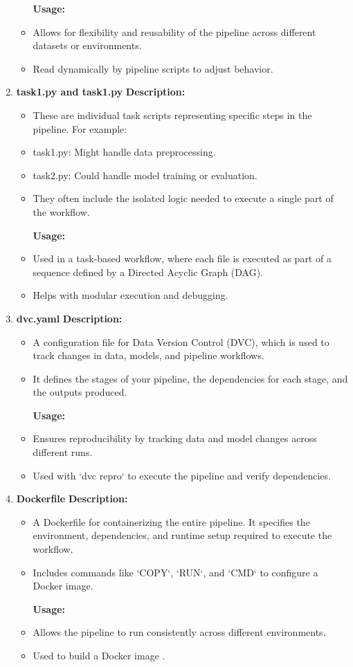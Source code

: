 \begin{enumerate}
\begin{itemize}
 \textbf{	Usage:}
 	\item Allows for flexibility and reusability of the pipeline across different datasets or environments.
 	\item Read dynamically by pipeline scripts to adjust behavior.
 \end{itemize}
 
 	\item \textbf{task1.py and task1.py} \linebreak
 	\textbf{Description:}
 	\begin{itemize}
 		\item These are individual task scripts representing specific steps in the pipeline. For example:
 	\item task1.py: Might handle data preprocessing.
 	\item task2.py: Could handle model training or evaluation.
 	\item They often include the isolated logic needed to execute a single part of the workflow.
 	
 	\textbf{Usage:}
 	\item Used in a task-based workflow, where each file is executed as part of a sequence defined by a Directed Acyclic Graph (DAG).
 	\item Helps with modular execution and debugging.
 		\end{itemize}
 		
 	\item  \textbf{dvc.yaml} \linebreak
 	\textbf{Description:}
 	\begin{itemize}
 		\item A configuration file for Data Version Control (DVC), which is used to track changes in data, models, and pipeline workflows.
 	\item It defines the stages of your pipeline, the dependencies for each stage, and the outputs produced.
 	
 	\textbf{Usage:}
 	\item Ensures reproducibility by tracking data and model changes across different runs.
 	\item Used with `dvc repro` to execute the pipeline and verify dependencies.
 \end{itemize}
 
 	\item \textbf{Dockerfile} \linebreak
 	\textbf{Description:}
 	\begin{itemize}
 		\item A Dockerfile for containerizing the entire pipeline. It specifies the environment, dependencies, and runtime setup required to execute the workflow.
 	\item Includes commands like `COPY`, `RUN`, and `CMD` to configure a Docker image.
 	
 	\textbf{Usage:}
 	\item Allows the pipeline to run consistently across different environments.
 	\item Used to build a Docker image .
 \end{itemize}
 \end{enumerate}

